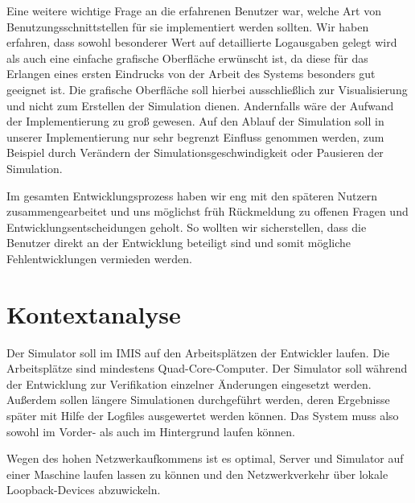Eine weitere wichtige Frage an die erfahrenen Benutzer war, welche Art von Benutzungsschnittstellen für sie implementiert werden sollten. Wir haben erfahren, dass sowohl besonderer Wert auf detaillierte Logausgaben gelegt wird als auch eine einfache grafische Oberfläche erwünscht ist, da diese für das Erlangen eines ersten Eindrucks von der Arbeit des Systems besonders gut geeignet ist. Die grafische Oberfläche soll hierbei ausschließlich zur Visualisierung und nicht zum Erstellen der Simulation dienen. Andernfalls  wäre der Aufwand der Implementierung zu groß gewesen. Auf den Ablauf der Simulation soll in unserer Implementierung nur sehr begrenzt Einfluss genommen werden, zum Beispiel durch Verändern der Simulationsgeschwindigkeit oder Pausieren der Simulation.

Im gesamten Entwicklungsprozess haben wir eng mit den späteren Nutzern zusammengearbeitet und uns möglichst früh Rückmeldung zu offenen Fragen und Entwicklungsentscheidungen geholt. So wollten wir sicherstellen, dass die Benutzer direkt an der Entwicklung beteiligt sind und somit mögliche Fehlentwicklungen vermieden werden.


\section{Kontextanalyse}\label{sec:context_ana}
Der Simulator soll im IMIS auf den Arbeitsplätzen der Entwickler laufen. Die Arbeitsplätze sind mindestens Quad-Core-Computer. Der Simulator soll während der Entwicklung zur Verifikation einzelner Änderungen eingesetzt werden. Außerdem sollen längere Simulationen durchgeführt werden, deren Ergebnisse später mit Hilfe der Logfiles ausgewertet werden können. Das System muss also sowohl im Vorder- als auch im Hintergrund laufen können.

Wegen des hohen Netzwerkaufkommens ist es optimal, Server und Simulator auf einer Maschine laufen lassen zu können und den Netzwerkverkehr über lokale Loopback-Devices abzuwickeln.
